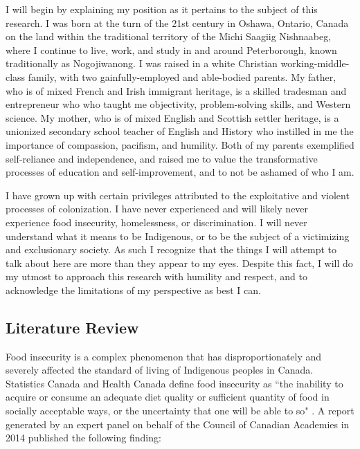 \documentclass{report}
\begin{document}
\hspace{24pt} I will begin by explaining my position as it pertains to the subject of this research. I was born at the turn of the 21st century in Oshawa, Ontario, Canada on the land within the traditional territory of the Michi Saagiig Nishnaabeg, where I continue to live, work, and study in and around Peterborough, known traditionally as Nogojiwanong. I was raised in a white Christian working-middle-class family, with two gainfully-employed and able-bodied parents. My father, who is of mixed French and Irish immigrant heritage, is a skilled tradesman and entrepreneur who who taught me objectivity, problem-solving skills, and Western science. My mother, who is of mixed English and Scottish settler heritage, is a unionized secondary school teacher of English and History who instilled in me the importance of compassion, pacifism, and humility. Both of my parents exemplified self-reliance and independence, and raised me to value the transformative processes of education and self-improvement, and to not be ashamed of who I am.

\hspace{24pt} I have grown up with certain privileges attributed to the exploitative and violent processes of colonization. I have never experienced and will likely never experience food insecurity, homelessness, or discrimination. I will never understand what it means to be Indigenous, or to be the subject of a victimizing and exclusionary society. As such I recognize that the things I will attempt to talk about here are more than they appear to my eyes. Despite this fact, I will do my utmost to approach this research with humility and respect, and to acknowledge the limitations of my perspective as best I can.

\clearpage

\subsection{Literature Review}



\hspace{24pt} Food insecurity is a complex phenomenon that has disproportionately and severely affected the standard of living of Indigenous peoples in Canada.
Statistics Canada and Health Canada define food insecurity as “the inability to acquire or consume an adequate diet quality or sufficient quantity of food in socially acceptable ways, or the uncertainty that one will be able to so" \parencite{statscanfoodinsecurity}.
A report generated by an expert panel on behalf of the Council of Canadian Academies in 2014 published the following finding:
\end{document}
